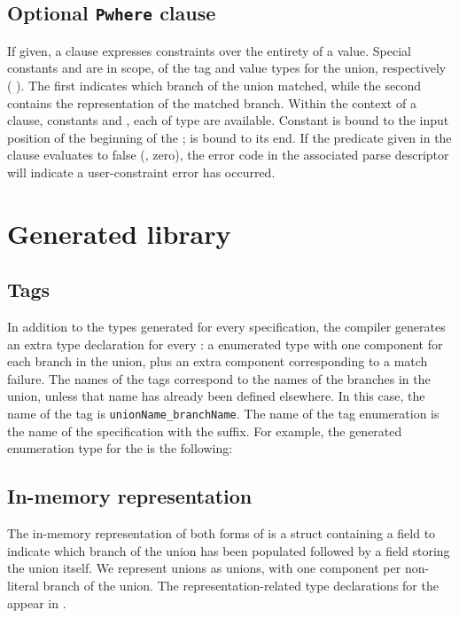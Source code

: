\subsection{Optional \texttt{Pwhere} clause}
If given, a \Pwhere{} clause expresses constraints over the entirety
of a \Punion{} value.  Special constants  and  are
in scope, of the tag and value types for the union, respectively
(\cf{} ).  The
first indicates which branch of the union matched, while the second
contains the representation of the matched branch. 
Within the context of a 
\Pparsecheck{} clause, constants  and , each of type 
\PDCpost{} are available.  Constant  is bound to the input
position of the beginning of the \punion{};  is bound to its end.
If the predicate given in
the \Pwhere{} clause evaluates to false (\ie{}, zero), the error code
in the associated parse descriptor will indicate a user-constraint
error has occurred.  

\section{Generated library}
\subsection{Tags}
\label{sec:unions-tags}
In addition to the types generated for every \pads{} specification,
the \pads{} compiler generates an extra type 
declaration for every \Punion{}: a enumerated type with one component
for each branch in the union, plus an extra component corresponding to
a match failure.  The names of the tags correspond to the names of the
branches in the union, unless that name
has already been defined 
elsewhere.  In this case, the name of the tag is 
\texttt{unionName\_branchName}.  
The name of the tag enumeration is the name of
the \pads{} specification with the  suffix.
For example, the generated enumeration type
for the \Punion{}  is the following:

%


\subsection{In-memory representation}
\label{sec:unions-rep}
The in-memory representation of both forms of \Punion{} is 
a \C{} struct containing a  field to indicate which branch of the
union has been populated followed by a  field storing the union
itself.  We represent unions as \C{} unions, with one component per
non-literal branch of the union.  
The representation-related type declarations for
the \Punion{}  appear in .

